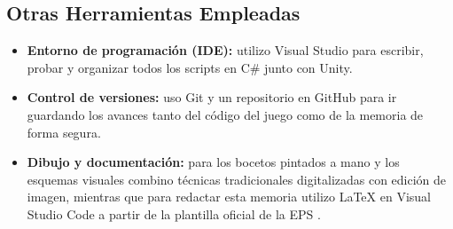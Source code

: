 \subsection{Otras Herramientas Empleadas}
\begin{itemize}
    \item \textbf{Entorno de programación (IDE):} utilizo Visual Studio para escribir, probar y organizar todos los scripts en C\# junto con Unity.
    \item \textbf{Control de versiones:} uso Git y un repositorio en GitHub para ir guardando los avances tanto del código del juego como de la memoria de forma segura.
    \item \textbf{Dibujo y documentación:} para los bocetos pintados a mano y los esquemas visuales combino técnicas tradicionales digitalizadas con edición de imagen, mientras que para redactar esta memoria utilizo LaTeX en Visual Studio Code a partir de la plantilla oficial de la \ac{EPS} \parencite{eps2015}.
\end{itemize}